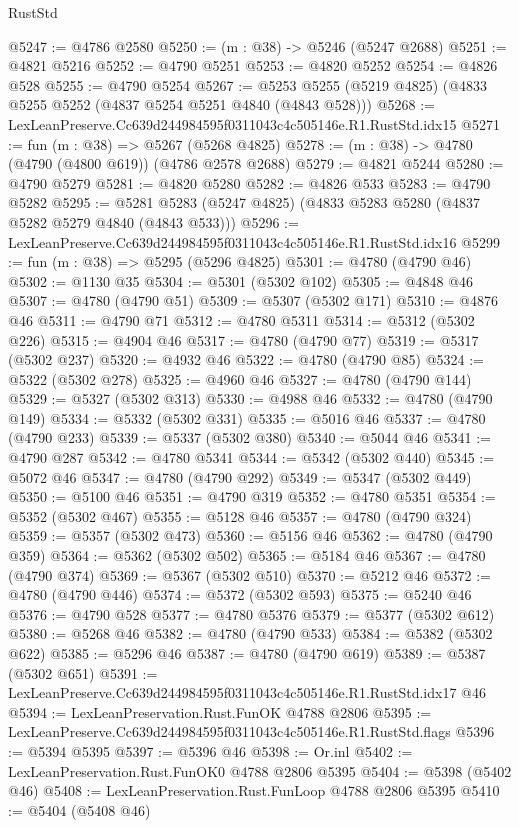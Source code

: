 \begin{lexlean}{RustStd}
\begin{coremodule}
@5247 := @4786 @2580
@5250 := (m : @38) -> @5246 (@5247 @2688)
@5251 := @4821 @5216
@5252 := @4790 @5251
@5253 := @4820 @5252
@5254 := @4826 @528
@5255 := @4790 @5254
@5267 := @5253 @5255 (@5219 @4825) (@4833 @5255 @5252 (@4837 @5254 @5251 @4840 (@4843 @528)))
@5268 := LexLeanPreserve.Cc639d244984595f0311043c4c505146e.R1.RustStd.idx15
@5271 := fun (m : @38) => @5267 (@5268 @4825)
@5278 := (m : @38) -> @4780 (@4790 (@4800 @619)) (@4786 @2578 @2688)
@5279 := @4821 @5244
@5280 := @4790 @5279
@5281 := @4820 @5280
@5282 := @4826 @533
@5283 := @4790 @5282
@5295 := @5281 @5283 (@5247 @4825) (@4833 @5283 @5280 (@4837 @5282 @5279 @4840 (@4843 @533)))
@5296 := LexLeanPreserve.Cc639d244984595f0311043c4c505146e.R1.RustStd.idx16
@5299 := fun (m : @38) => @5295 (@5296 @4825)
@5301 := @4780 (@4790 @46)
@5302 := @1130 @35
@5304 := @5301 (@5302 @102)
@5305 := @4848 @46
@5307 := @4780 (@4790 @51)
@5309 := @5307 (@5302 @171)
@5310 := @4876 @46
@5311 := @4790 @71
@5312 := @4780 @5311
@5314 := @5312 (@5302 @226)
@5315 := @4904 @46
@5317 := @4780 (@4790 @77)
@5319 := @5317 (@5302 @237)
@5320 := @4932 @46
@5322 := @4780 (@4790 @85)
@5324 := @5322 (@5302 @278)
@5325 := @4960 @46
@5327 := @4780 (@4790 @144)
@5329 := @5327 (@5302 @313)
@5330 := @4988 @46
@5332 := @4780 (@4790 @149)
@5334 := @5332 (@5302 @331)
@5335 := @5016 @46
@5337 := @4780 (@4790 @233)
@5339 := @5337 (@5302 @380)
@5340 := @5044 @46
@5341 := @4790 @287
@5342 := @4780 @5341
@5344 := @5342 (@5302 @440)
@5345 := @5072 @46
@5347 := @4780 (@4790 @292)
@5349 := @5347 (@5302 @449)
@5350 := @5100 @46
@5351 := @4790 @319
@5352 := @4780 @5351
@5354 := @5352 (@5302 @467)
@5355 := @5128 @46
@5357 := @4780 (@4790 @324)
@5359 := @5357 (@5302 @473)
@5360 := @5156 @46
@5362 := @4780 (@4790 @359)
@5364 := @5362 (@5302 @502)
@5365 := @5184 @46
@5367 := @4780 (@4790 @374)
@5369 := @5367 (@5302 @510)
@5370 := @5212 @46
@5372 := @4780 (@4790 @446)
@5374 := @5372 (@5302 @593)
@5375 := @5240 @46
@5376 := @4790 @528
@5377 := @4780 @5376
@5379 := @5377 (@5302 @612)
@5380 := @5268 @46
@5382 := @4780 (@4790 @533)
@5384 := @5382 (@5302 @622)
@5385 := @5296 @46
@5387 := @4780 (@4790 @619)
@5389 := @5387 (@5302 @651)
@5391 := LexLeanPreserve.Cc639d244984595f0311043c4c505146e.R1.RustStd.idx17 @46
@5394 := LexLeanPreservation.Rust.FunOK @4788 @2806
@5395 := LexLeanPreserve.Cc639d244984595f0311043c4c505146e.R1.RustStd.flags
@5396 := @5394 @5395
@5397 := @5396 @46
@5398 := Or.inl
@5402 := LexLeanPreservation.Rust.FunOK0 @4788 @2806 @5395
@5404 := @5398 (@5402 @46)
@5408 := LexLeanPreservation.Rust.FunLoop @4788 @2806 @5395
@5410 := @5404 (@5408 @46)

\end{coremodule}
\end{lexlean}
